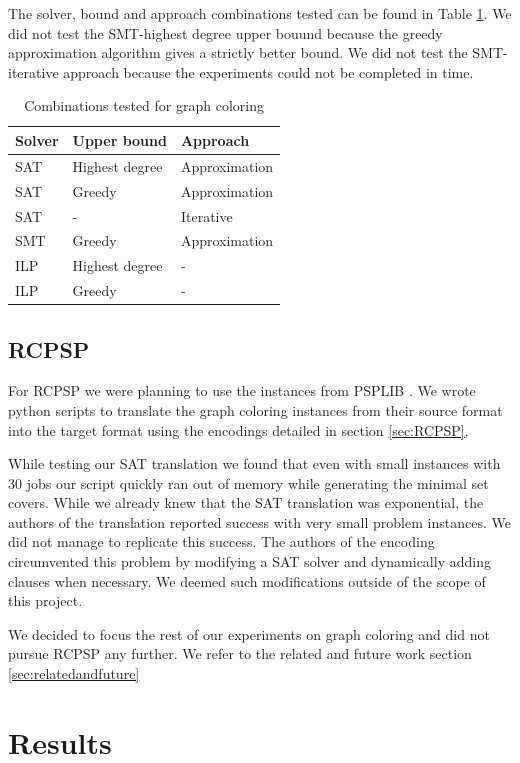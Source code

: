 \documentclass{sig-alternate}
\begin{document}
The solver, bound and approach combinations tested can be found in Table \ref{table:gccombinations}.
We did not test the SMT-highest degree upper bouund because the greedy approximation algorithm gives a strictly better bound.
We did not test the SMT-iterative approach because the experiments could not be completed in time.

\begin{table}
\begin{tabular}{ |l|l|l| }
\hline
Solver & Upper bound & Approach \\
\hline
SAT & Highest degree & Approximation \\
\hline
SAT & Greedy & Approximation \\
\hline
SAT & - & Iterative \\
\hline
SMT & Greedy & Approximation \\
\hline
ILP & Highest degree & - \\
\hline
ILP & Greedy & - \\
\hline
\end{tabular}
\caption{Combinations tested for graph coloring}
\label{table:gccombinations}
\end{table}

\subsection{RCPSP}

For RCPSP we were planning to use the instances from PSPLIB \cite{kolisch1997psplib}.
We wrote python scripts to translate the graph coloring instances from their source format into the target format using the encodings detailed in section \ref{sec:RCPSP}.

While testing our SAT translation we found that even with small instances with 30 jobs our script quickly ran out of memory while generating the minimal set covers.
While we already knew that the SAT translation was exponential, the authors of the translation reported success with very small problem instances. We did not manage to replicate this success.
The authors of the encoding circumvented this problem by modifying a SAT solver and dynamically adding clauses when necessary.
We deemed such modifications outside of the scope of this project.

We decided to focus the rest of our experiments on graph coloring and did not pursue RCPSP any further.
We refer to the related and future work section \ref{sec:relatedandfuture}

\section{Results}
\end{document}
